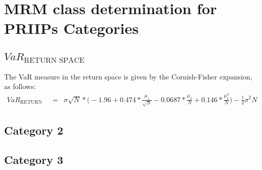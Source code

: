 \section{MRM class determination for PRIIPs Categories}

\subsection{$VaR_{\text{RETURN SPACE}}$}
The VaR measure in the return space is given by the Cornish-Fisher expansion, as follows:
\begin{eqnarray}
	\label{Eq:VaR}
	\nonumber
	VaR_{\text{RETURN SPACE}} &=& \sigma\sqrt{N} * \Bigg(-1.96 + 0.474 *  \frac{\mu_{1}}{\sqrt{N}} - 0.0687 * \frac{\mu_{2}}{N} + 0.146 * \frac{\mu_{1}^{2}}{N}\Bigg) - \frac{1}{2}\sigma^{2}N
\end{eqnarray}

\subsection{Category 2}

\subsection{Category 3}

